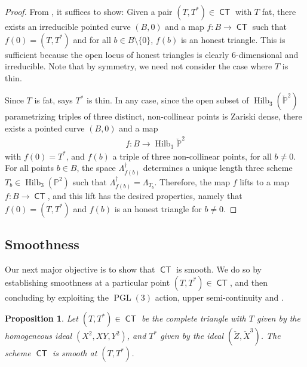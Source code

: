 \documentclass[reqno, 11pt]{amsart}
\theoremstyle{plain}
\newtheorem{proposition}[theorem]{Proposition}
\theoremstyle{remark}
\renewcommand{\P}{\mathbb{P}}
\DeclareMathOperator{\PGL}{PGL}
\DeclareMathOperator{\Hilb}{Hilb}
\DeclareMathOperator{\CT}{\mathsf{CT}}
\newcommand{\from}{\colon}
\begin{document}
\begin{proof}
  From , it suffices to show: Given
  a pair $(T, T^{*}) \in \CT$ with $T$ fat, there exists an
  irreducible pointed curve $(B,0)$ and a map $f \from B \to \CT$ such
  that $f(0) = (T, T^{*})$ and for all $b \in B \setminus \{0\}$, $f(b)$
  is an honest triangle.  This is sufficient because the open locus of
  honest triangles is clearly $6$-dimensional and irreducible. Note
  that by symmetry, we need not consider the case where $T$ is thin.

  Since $T$ is fat,  says $T^{*}$ is
  thin. In any case, since the open subset of $\Hilb_{3}(\check{\P}^{2})$
  parametrizing triples of three distinct, non-collinear points is
  Zariski dense, there exists a pointed curve $(B,0)$ and a map
  \begin{eqnarray*}
    f \from B \to \Hilb_{3}\check{\P}^{2}
  \end{eqnarray*}
  with $f(0) = T^{*}$, and $f(b)$ a triple of three non-collinear
  points, for all $b \neq 0$. For all points $b \in B$, the space
  $\Lambda_{f(b)}^{\dagger}$ determines a unique length three scheme
  $T_{b} \in \Hilb_{3}(\P^{2})$ such that
  $\Lambda_{f(b)}^{\dagger} = \Lambda_{T_{b}}$. Therefore, the map $f$
  lifts to a map $f \from B \to \CT$, and this lift has the desired
  properties, namely that $f(0) = (T, T^{*})$ and $f(b)$ is an honest triangle
  for $b \neq 0$.
\end{proof}


\subsection{Smoothness} Our next major objective is to show that $\CT$
is smooth. We do so by establishing smoothness at a particular point
$(T, T^{*}) \in \CT$, and then concluding by exploiting the $\PGL(3)$ action,  upper semi-continuity and
.

\begin{proposition}\label{prop:smoothpoint} Let
  $(T, T^{*}) \in \CT$ be the complete triangle with $T$ given by the
  homogeneous ideal $(X^{2},XY,Y^{2})$, and $T^{*}$ given by the ideal
  $(\check{Z}, \check{X}^{3})$. The scheme $\CT$ is smooth at $(T, T^{*})$.
\end{proposition}
\end{document}
